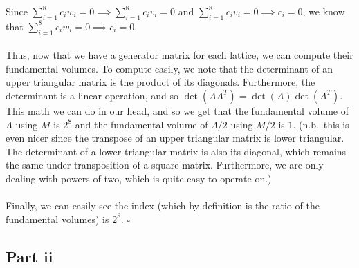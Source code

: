 \documentclass[letterpaper]{article}
\newcommand*{\QED}{\hfill\ensuremath{\square}}%
\begin{document}
Since $ \sum_{i = 1}^{8} c_i w_i = 0 \implies \sum_{i = 1}^{8} c_i v_i = 0 $ and $ \sum_{i = 1}^{8} c_i v_i = 0 \implies c_i = 0 $, we know that $ \sum_{i = 1}^{8} c_i w_i = 0 \implies c_i = 0 $.
\\ \\
Thus, now that we have a generator matrix for each lattice, we can compute their fundamental volumes.
To compute easily, we note that the determinant of an upper triangular matrix is the product of its diagonals.
Furthermore, the determinant is a linear operation, and so $ \det{(A A^T)} = \det{(A)} \det{(A^T)} $.
This math we can do in our head, and so we get that the fundamental volume of $ \Lambda $ using $ M $ is $ 2^8 $ and the fundamental volume of $ \Lambda / 2 $ using $ M / 2 $ is $ 1 $.
(n.b.\ this is even nicer since the transpose of an upper triangular matrix is lower triangular. The determinant of a lower triangular matrix is also its diagonal, which remains the same under transposition of a square matrix. Furthermore, we are only dealing with powers of two, which is quite easy to operate on.)
\\ \\
Finally, we can easily see the index (which by definition is the ratio of the fundamental volumes) is $ 2^8 $.
\QED{}

\subsection{Part ii}
\label{sub:2Partii}
\end{document}
